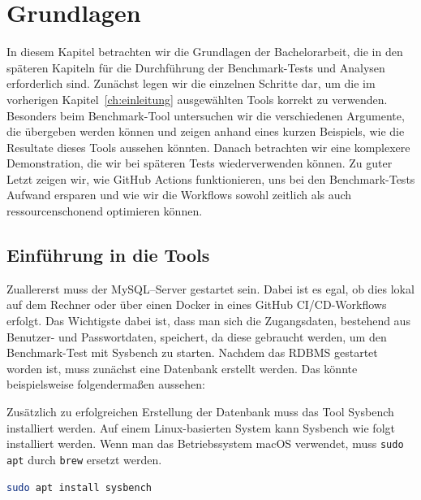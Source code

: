 \chapter{Grundlagen}\label{ch:grundlagen}

In diesem Kapitel betrachten wir die Grundlagen der Bachelorarbeit, die in den späteren Kapiteln für die Durchführung der Benchmark-Tests und Analysen erforderlich sind.
Zunächst legen wir die einzelnen Schritte dar, um die im vorherigen Kapitel~\ref{ch:einleitung} ausgewählten Tools korrekt zu verwenden.
Besonders beim Benchmark-Tool untersuchen wir die verschiedenen Argumente, die übergeben werden können und zeigen anhand eines kurzen Beispiels, wie die Resultate dieses Tools aussehen könnten.
Danach betrachten wir eine komplexere Demonstration, die wir bei späteren Tests wiederverwenden können.
Zu guter Letzt zeigen wir, wie GitHub Actions funktionieren, uns bei den Benchmark-Tests Aufwand ersparen und wie wir die Workflows sowohl zeitlich als auch ressourcenschonend optimieren können.

\section{Einführung in die Tools}\label{sec:einfuhrung-in-die-tools}

Zuallererst muss der MySQL–Server gestartet sein.
Dabei ist es egal, ob dies lokal auf dem Rechner oder über einen Docker in eines GitHub CI/CD-Workflows erfolgt.
Das Wichtigste dabei ist, dass man sich die Zugangsdaten, bestehend aus Benutzer- und Passwortdaten, speichert, da diese gebraucht werden, um den Benchmark-Test mit Sysbench zu starten.
Nachdem das RDBMS gestartet worden ist, muss zunächst eine Datenbank erstellt werden.
Das könnte beispielsweise folgendermaßen aussehen:

\vspace{-5pt}

\vspace{-9pt}

Zusätzlich zu erfolgreichen Erstellung der Datenbank muss das Tool Sysbench installiert werden.
Auf einem Linux-basierten System kann Sysbench wie folgt installiert werden.
Wenn man das Betriebssystem macOS verwendet, muss \texttt{sudo apt} durch \texttt{brew} ersetzt werden.

\vspace{-5pt}
\begin{lstlisting}[language=bash]
sudo apt install sysbench
\end{lstlisting}
\vspace{-9pt}

